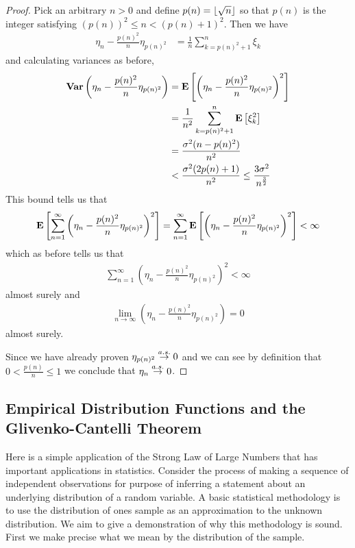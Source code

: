 \begin{proof}
Pick an arbitrary $n > 0$ and define $p(n) = \left \lfloor \sqrt{n} \right \rfloor$ so that
$p(n)$ is the integer satisfying $(p(n))^2 \leq n < (p(n) + 1)^2$.
Then we have
\begin{align*}
\eta_n - \frac{p(n)^2}{n} \eta_{p(n)^2} &= \frac{1}{n}\sum_{k=p(n)^2 + 1}^n \xi_k
\end{align*}
and calculating variances as before,
\begin{align*}
\textbf{Var} \left (\eta_n - \frac{p(n)^2}{n} \eta_{p(n)^2} \right ) &=
\textbf{E}\left[\left ( \eta_n - \frac{p(n)^2}{n} \eta_{p(n)^2} \right
  )^2\right] \\
&=
\frac{1}{n^2}\sum_{k=p(n)^2 + 1}^n \textbf{E}\left[\xi_k^2\right] \\
&= \frac{\sigma^2 (n - p(n)^2)}{n^2} \\
&< \frac{\sigma^2 (2 p(n) + 1)}{n^2} \leq \frac{3\sigma^2}{n^\frac{3}{2}}
\end{align*}
This bound tells us that 
\begin{align*}
 \textbf{E}\left[ \sum_{n=1}^\infty \left ( \eta_n - \frac{p(n)^2}{n} \eta_{p(n)^2} \right
  )^2\right] = \sum_{n=1}^\infty \textbf{E}\left[\left ( \eta_n - \frac{p(n)^2}{n} \eta_{p(n)^2} \right
  )^2\right]  < \infty
\end{align*}
which as before tells us that 
\begin{align*}
\sum_{n=1}^\infty \left ( \eta_n - \frac{p(n)^2}{n} \eta_{p(n)^2} \right
  )^2 < \infty 
\end{align*}
almost surely and 
\begin{align*}
\lim_{n\to \infty} \left ( \eta_n - \frac{p(n)^2}{n} \eta_{p(n)^2}
\right ) = 0
\end{align*}
almost surely.

Since we have already proven $\eta_{p(n)^2} \overset{a.s.}\to 0$ and we can see by
definition that $0 < \frac{p(n)}{n} \leq 1$ we conclude that $\eta_n
\overset{a.s.}\to 0$.
\end{proof}

\subsection{Empirical Distribution Functions and the Glivenko-Cantelli Theorem}

Here is a simple application of the Strong Law of Large Numbers that
has important applications in statistics.  Consider the process of
making a sequence of independent observations for purpose of inferring
a statement about an underlying distribution of a random variable.  A
basic statistical methodology is to use the distribution of ones
sample as an approximation to the unknown distribution.  We aim to
give a demonstration of why this methodology is sound.  First we make
precise what we mean by the distribution of the sample.


